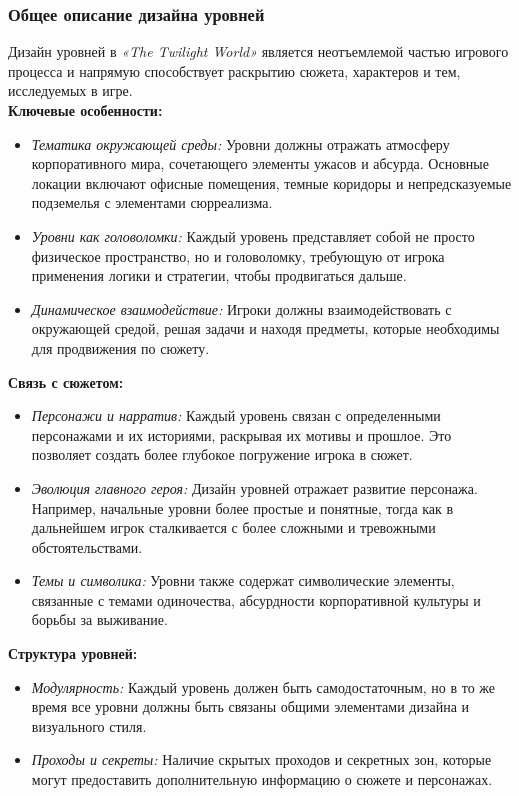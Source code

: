 \documentclass{article}
\begin{document}
	\subsubsection{Общее описание дизайна уровней}
	Дизайн уровней в \textit{«The Twilight World»} является неотъемлемой частью игрового процесса и напрямую способствует раскрытию сюжета, характеров и тем, исследуемых в игре.\\
	\textbf{Ключевые особенности:}
	\begin{itemize}
		\item\textit{Тематика окружающей среды:} Уровни должны отражать атмосферу корпоративного мира, сочетающего элементы ужасов и абсурда. Основные локации включают офисные помещения, темные коридоры и непредсказуемые подземелья с элементами сюрреализма.
		\item\textit{Уровни как головоломки:} Каждый уровень представляет собой не просто физическое пространство, но и головоломку, требующую от игрока применения логики и стратегии, чтобы продвигаться дальше.
		\item\textit{Динамическое взаимодействие:} Игроки должны взаимодействовать с окружающей средой, решая задачи и находя предметы, которые необходимы для продвижения по сюжету.
	\end{itemize}
	\textbf{Связь с сюжетом:}
	\begin{itemize}
		\item\textit{Персонажи и нарратив:} Каждый уровень связан с определенными персонажами и их историями, раскрывая их мотивы и прошлое. Это позволяет создать более глубокое погружение игрока в сюжет.
		\item\textit{Эволюция главного героя:} Дизайн уровней отражает развитие персонажа. Например, начальные уровни более простые и понятные, тогда как в дальнейшем игрок сталкивается с более сложными и тревожными обстоятельствами.
		\item\textit{Темы и символика:} Уровни также содержат символические элементы, связанные с темами одиночества, абсурдности корпоративной культуры и борьбы за выживание.
	\end{itemize}
	\textbf{Структура уровней:}
	\begin{itemize}
		\item\textit{Модулярность:} Каждый уровень должен быть самодостаточным, но в то же время все уровни должны быть связаны общими элементами дизайна и визуального стиля.
		\item\textit{Проходы и секреты:} Наличие скрытых проходов и секретных зон, которые могут предоставить дополнительную информацию о сюжете и персонажах.\\
		
	\end{itemize}
	
\end{document}
